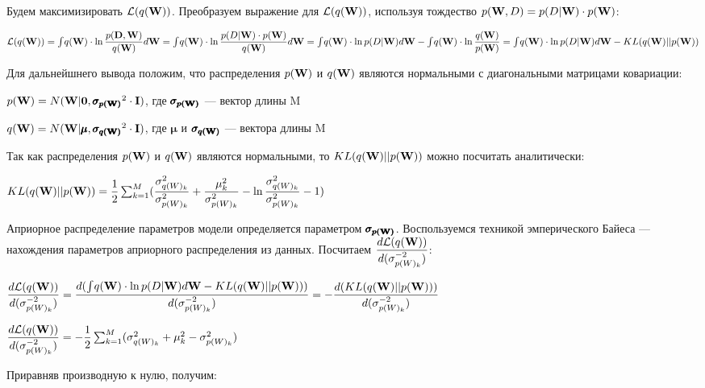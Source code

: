 \documentclass{article}
\begin{document}
Будем максимизировать $\mathcal{L}(q(\bold{W}))$. Преобразуем выражение для $\mathcal{L}(q(\bold{W}))$, используя тождество
$p(\bold{W}, D) = p(D | \bold{W}) \cdot p(\bold{W})$:

$
\mathcal{L}(q(\bold{W})) =
\int_{}{} q(\bold{W}) \cdot \ln{\dfrac{p(\bold{D}, \bold{W})}{q(\bold{W})}} d\bold{W} =
\int_{}{} q(\bold{W}) \cdot \ln{\dfrac{p(D | \bold{W}) \cdot p(\bold{W})}{q(\bold{W})}} d\bold{W} = 
\int_{}{} q(\bold{W}) \cdot \ln{p(D | \bold{W})} d\bold{W} - \int_{}{} q(\bold{W}) \cdot \ln{\dfrac{q(\bold{W})}{p(\bold{W})}} = 
\int_{}{} q(\bold{W}) \cdot \ln{p(D | \bold{W})} d\bold{W} - KL(q(\bold{W}) || p(\bold{W}))
$

Для дальнейшнего вывода положим, что распределения $p(\bold{W})$ и $q(\bold{W})$ являются нормальными с диагональными матрицами ковариации:

$p(\bold{W}) = N(\bold{W} | \bold{0}, \pmb{\sigma_{p(\bold{W})}}^{2} \cdot \bold{I})$, где $\pmb{\sigma_{p(\bold{W})}}$ — вектор длины M

$q(\bold{W}) = N(\bold{W} | \pmb{\mu}, \pmb{\sigma_{q(\bold{W})}}^{2} \cdot \bold{I})$, где $\pmb{\mu}$ и $\pmb{\sigma_{q(\bold{W})}}$ — вектора длины M

Так как распределения $p(\bold{W})$ и $q(\bold{W})$ являются нормальными, то $KL(q(\bold{W}) || p(\bold{W}))$ можно посчитать аналитически:

$
KL(q(\bold{W}) || p(\bold{W})) = 
\dfrac{1}{2}\sum_{k=1}^{M}(\dfrac{\sigma_{{q(W)_{k}}}^2}{\sigma_{{p(W)_{k}}}^2} + \dfrac{\mu_{k}^2}{\sigma_{{p(W)_{k}}}^2} - \ln{\dfrac{\sigma_{{q(W)_{k}}}^2}{\sigma_{{p(W)_{k}}}^2}} - 1)
$

Априорное распределение параметров модели определяется параметром $\pmb{\sigma_{p(\bold{W})}}$. Воспользуемся техникой эмперического Байеса — нахождения параметров априорного распределения из данных. Посчитаем
$\dfrac{d\mathcal{L}(q(\bold{W}))}{d ({\sigma_{p(W)_{k}}^{-2}})}$:

$
\dfrac{d\mathcal{L}(q(\bold{W}))}{d ({\sigma_{p(W)_{k}}^{-2}})} =
\dfrac{d (\int_{}{} q(\bold{W}) \cdot \ln{p(D | \bold{W})} d\bold{W} - KL(q(\bold{W}) || p(\bold{W})))}{d ({\sigma_{p(W)_{k}}^{-2}})} =
- \dfrac{d (KL(q(\bold{W}) || p(\bold{W})))}{d ({\sigma_{p(W)_{k}}^{-2}})}$

$
\dfrac{d\mathcal{L}(q(\bold{W}))}{d ({\sigma_{p(W)_{k}}^{-2}})} =
-\dfrac{1}{2}\sum_{k=1}^{M}(\sigma_{{q(W)_{k}}}^2 + \mu_{k}^2 - \sigma_{{p(W)_{k}}}^2)
$

Приравняв производную к нулю, получим:
\end{document}
